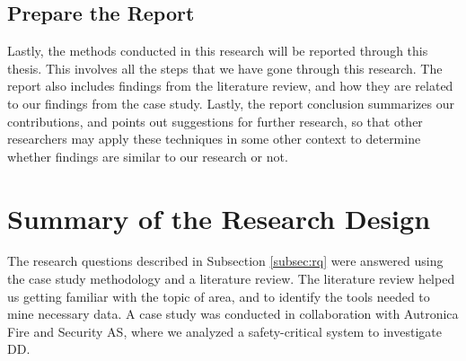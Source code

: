 \subsection{Prepare the Report}
Lastly, the methods conducted in this research will be reported through this thesis. This involves all the steps that we have gone through this research. The report also includes findings from the literature review, and how they are related to our findings from the case study. Lastly, the report conclusion summarizes our contributions, and points out suggestions for further research, so that other researchers may apply these techniques in some other context to determine whether findings are similar to our research or not.


\section{Summary of the Research Design}
The research questions described in Subsection \ref{subsec:rq} were answered using the case study methodology and a literature review. The literature review helped us getting familiar with the topic of area, and to identify the tools needed to mine necessary data. A case study was conducted in collaboration with Autronica Fire and Security AS, where we analyzed a safety-critical system to investigate DD.



























